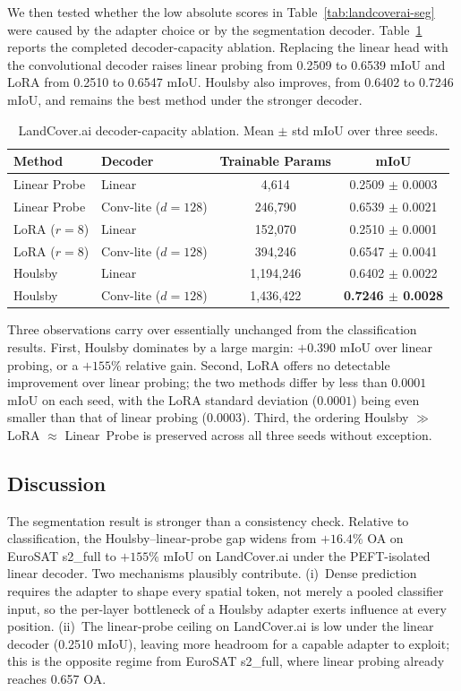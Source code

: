 \documentclass[11pt]{article}
\begin{document}
We then tested whether the low absolute scores in Table~\ref{tab:landcoverai-seg} were caused by the adapter choice or by the segmentation decoder. Table~\ref{tab:landcoverai-decoder-ablation} reports the completed decoder-capacity ablation. Replacing the linear head with the convolutional decoder raises linear probing from 0.2509 to 0.6539 mIoU and LoRA from 0.2510 to 0.6547 mIoU. Houlsby also improves, from 0.6402 to 0.7246 mIoU, and remains the best method under the stronger decoder.

\begin{table}[h]
\centering
\small
\caption{LandCover.ai decoder-capacity ablation. Mean $\pm$ std mIoU over three seeds.}
\label{tab:landcoverai-decoder-ablation}
\begin{tabular}{llcc}
\toprule
Method & Decoder & Trainable Params & mIoU \\
\midrule
Linear Probe & Linear & 4{,}614 & 0.2509 $\pm$ 0.0003 \\
Linear Probe & Conv-lite ($d=128$) & 246{,}790 & 0.6539 $\pm$ 0.0021 \\
LoRA ($r=8$) & Linear & 152{,}070 & 0.2510 $\pm$ 0.0001 \\
LoRA ($r=8$) & Conv-lite ($d=128$) & 394{,}246 & 0.6547 $\pm$ 0.0041 \\
Houlsby & Linear & 1{,}194{,}246 & 0.6402 $\pm$ 0.0022 \\
Houlsby & Conv-lite ($d=128$) & 1{,}436{,}422 & \textbf{0.7246 $\pm$ 0.0028} \\
\bottomrule
\end{tabular}
\end{table}

Three observations carry over essentially unchanged from the classification results. First, Houlsby dominates by a large margin: $+0.390$ mIoU over linear probing, or a $+155\%$ relative gain. Second, LoRA offers no detectable improvement over linear probing; the two methods differ by less than $0.0001$ mIoU on each seed, with the LoRA standard deviation ($0.0001$) being even smaller than that of linear probing ($0.0003$). Third, the ordering Houlsby $\gg$ LoRA $\approx$ Linear~Probe is preserved across all three seeds without exception.

\subsection{Discussion}

The segmentation result is stronger than a consistency check. Relative to classification, the Houlsby--linear-probe gap widens from $+16.4\%$ OA on EuroSAT s2\_full to $+155\%$ mIoU on LandCover.ai under the PEFT-isolated linear decoder. Two mechanisms plausibly contribute. (i)~Dense prediction requires the adapter to shape every spatial token, not merely a pooled classifier input, so the per-layer bottleneck of a Houlsby adapter exerts influence at every position. (ii)~The linear-probe ceiling on LandCover.ai is low under the linear decoder (0.2510 mIoU), leaving more headroom for a capable adapter to exploit; this is the opposite regime from EuroSAT s2\_full, where linear probing already reaches 0.657 OA.
\end{document}

